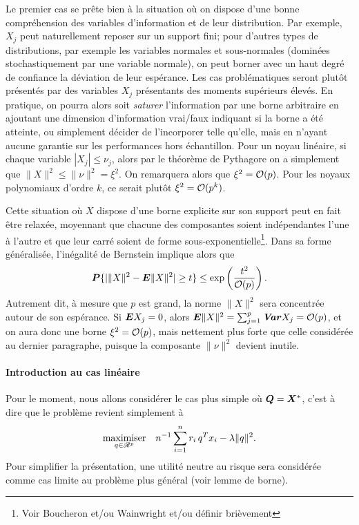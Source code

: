 Le premier cas se prête bien à la situation où on dispose d'une bonne compréhension des
variables d'information et de leur distribution. Par exemple, $X_j$ peut naturellement
reposer sur un support fini; pour d'autres types de distributions, par exemple les
variables normales et sous-normales (dominées stochastiquement par une variable normale),
on peut borner avec un haut degré de confiance la déviation de leur espérance. Les cas
problématiques seront plutôt présentés par des variables $X_j$ présentants des moments
supérieurs élevés. En pratique, on pourra alors soit \textit{saturer} l'information par
une borne arbitraire en ajoutant une dimension d'information vrai/faux indiquant si la
borne a été atteinte, ou simplement décider de l'incorporer telle qu'elle, mais en n'ayant
aucune garantie sur les performances hors échantillon. Pour un noyau linéaire, si chaque
variable $|X_j| \leq \nu_j$, alors par le théorème de Pythagore on a simplement que
$\|X\|^2 \leq \|\nu\|^2 = \xi^2$. On remarquera alors que $\xi^2 = \O(p)$. Pour les noyaux
polynomiaux d'ordre $k$, ce serait plutôt $\xi^2 = \O(p^k)$.

Cette situation où $X$ dispose d'une borne explicite sur son support peut en fait être
relaxée, moyennant que chacune des composantes soient indépendantes l'une à l'autre et que
leur carré soient de forme sous-exponentielle\footnote{Voir Boucheron et/ou Wainwright
  et/ou définir brièvement}. Dans sa forme généralisée, l'inégalité de
Bernstein implique alors que
\begin{equation}
  \pp\{|\|X\|^2 - \E\|X\|^2| \geq t\} \leq \exp\left(\frac{t^2}{\O(p)}\right).
\end{equation}
Autrement dit, à mesure que $p$ est grand, la norme $\|X\|^2$ sera concentrée autour de
son espérance. Si $\E X_j=0$, alors $\E\|X\|^2 = \sumj \Var X_j = \O(p)$, et on aura donc
une borne $\xi^2 = \O(p)$, mais nettement plus forte que celle considérée au dernier
paragraphe, puisque la composante $\|\nu\|^2$ devient inutile.




\paragraph{Introduction au cas linéaire}

Pour le moment, nous allons considérer le cas plus simple où $\Q = \X^*$, c'est à dire que
le problème revient simplement à 
\begin{equation}
  \maximizeEquation[q \in \Re^p]{n^{-1}\sumi r_i\,q^Tx_i - \lambda\|q\|^2.}
\end{equation}
Pour simplifier la présentation, une utilité neutre au risque sera considérée comme cas
limite au problème plus général (voir lemme de borne\cit).

